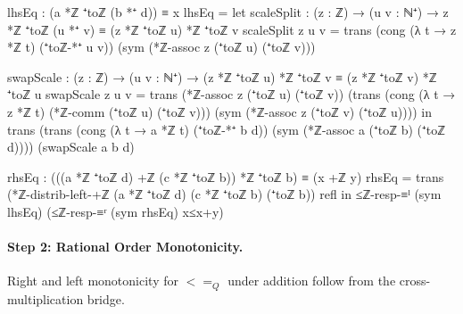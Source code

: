 \documentclass[11pt,a4paper]{book}
\def\leq{<=}%
\def\mathbb#1{#1}%
\begin{document}
\begin{code}
    lhsEq : (a *ℤ ⁺toℤ (b *⁺ d)) ≡ x
    lhsEq =
      let
        scaleSplit : (z : ℤ) → (u v : ℕ⁺) → z *ℤ ⁺toℤ (u *⁺ v) ≡ (z *ℤ ⁺toℤ u) *ℤ ⁺toℤ v
        scaleSplit z u v =
          trans
            (cong (λ t → z *ℤ t) (⁺toℤ-*⁺ u v))
            (sym (*ℤ-assoc z (⁺toℤ u) (⁺toℤ v)))

        swapScale : (z : ℤ) → (u v : ℕ⁺) → (z *ℤ ⁺toℤ u) *ℤ ⁺toℤ v ≡ (z *ℤ ⁺toℤ v) *ℤ ⁺toℤ u
        swapScale z u v =
          trans
            (*ℤ-assoc z (⁺toℤ u) (⁺toℤ v))
            (trans
              (cong (λ t → z *ℤ t) (*ℤ-comm (⁺toℤ u) (⁺toℤ v)))
              (sym (*ℤ-assoc z (⁺toℤ v) (⁺toℤ u))))
      in
      trans
        (trans
          (cong (λ t → a *ℤ t) (⁺toℤ-*⁺ b d))
          (sym (*ℤ-assoc a (⁺toℤ b) (⁺toℤ d))))
        (swapScale a b d)

    rhsEq : (((a *ℤ ⁺toℤ d) +ℤ (c *ℤ ⁺toℤ b)) *ℤ ⁺toℤ b) ≡ (x +ℤ y)
    rhsEq =
      trans
        (*ℤ-distrib-left-+ℤ (a *ℤ ⁺toℤ d) (c *ℤ ⁺toℤ b) (⁺toℤ b))
        refl
  in
  ≤ℤ-resp-≡ˡ (sym lhsEq) (≤ℤ-resp-≡ʳ (sym rhsEq) x≤x+y)
\end{code}

\paragraph{Step 2: Rational Order Monotonicity.}
Right and left monotonicity for $\leq_{\mathbb{Q}}$ under addition
follow from the cross-multiplication bridge.
\end{document}
